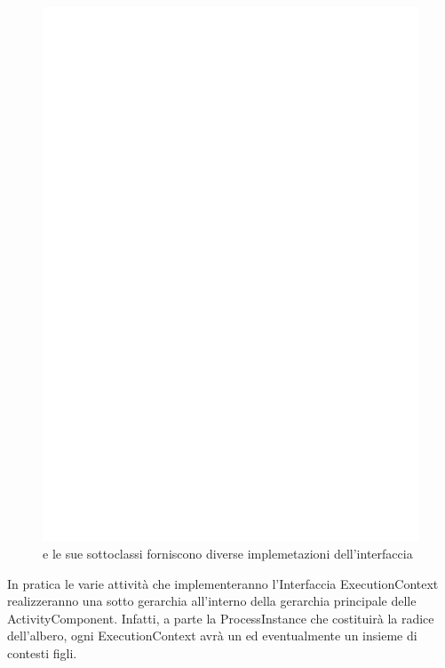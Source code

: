 \begin{figure}[t!]
\begin{center}
\includegraphics[scale=0.85]
{architettura_interna/dia/cntxclass}
\caption[ExecutionContext Class Diagram]{
   	{\small {} e le sue sottoclassi forniscono 
   	diverse implemetazioni dell'interfaccia	 }}
  \label{fig:cntxclass}
\end{center}
\end{figure}

In pratica le varie attività che implementeranno l'Interfaccia ExecutionContext
realizzeranno una sotto gerarchia all'interno della gerarchia principale delle
ActivityComponent. Infatti, a parte la ProcessInstance che costituirà la
radice dell'albero, ogni ExecutionContext avrà un  ed
eventualmente un insieme di contesti figli.


